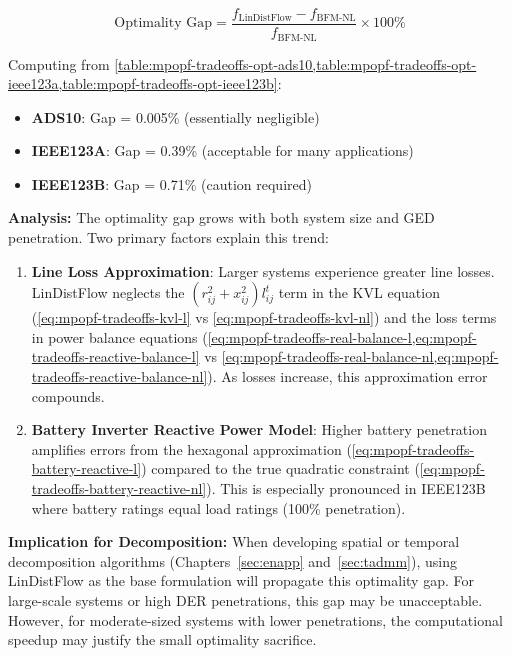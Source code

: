 \[
\text{Optimality Gap} = \frac{f_{\text{LinDistFlow}} - f_{\text{BFM-NL}}}{f_{\text{BFM-NL}}} \times 100\%
\]

Computing from \cref{table:mpopf-tradeoffs-opt-ads10,table:mpopf-tradeoffs-opt-ieee123a,table:mpopf-tradeoffs-opt-ieee123b}:
\begin{itemize}
    \item \textbf{ADS10}: Gap = 0.005\% (essentially negligible)
    \item \textbf{IEEE123A}: Gap = 0.39\% (acceptable for many applications)
    \item \textbf{IEEE123B}: Gap = 0.71\% (caution required)
\end{itemize}

\textbf{Analysis:} The optimality gap grows with both system size and GED penetration. Two primary factors explain this trend:

\begin{enumerate}
    \item \textbf{Line Loss Approximation}: Larger systems experience greater line losses. LinDistFlow neglects the \((r_{ij}^2 + x_{ij}^2)l_{ij}^t\) term in the KVL equation (\cref{eq:mpopf-tradeoffs-kvl-l} vs \cref{eq:mpopf-tradeoffs-kvl-nl}) and the loss terms in power balance equations (\cref{eq:mpopf-tradeoffs-real-balance-l,eq:mpopf-tradeoffs-reactive-balance-l} vs \cref{eq:mpopf-tradeoffs-real-balance-nl,eq:mpopf-tradeoffs-reactive-balance-nl}). As losses increase, this approximation error compounds.
    
    \item \textbf{Battery Inverter Reactive Power Model}: Higher battery penetration amplifies errors from the hexagonal approximation (\cref{eq:mpopf-tradeoffs-battery-reactive-l}) compared to the true quadratic constraint (\cref{eq:mpopf-tradeoffs-battery-reactive-nl}). This is especially pronounced in IEEE123B where battery ratings equal load ratings (100\% penetration).
\end{enumerate}

\textbf{Implication for Decomposition:} When developing spatial or temporal decomposition algorithms (Chapters~\ref{sec:enapp} and~\ref{sec:tadmm}), using LinDistFlow as the base formulation will propagate this optimality gap. For large-scale systems or high DER penetrations, this gap may be unacceptable. However, for moderate-sized systems with lower penetrations, the computational speedup may justify the small optimality sacrifice.

